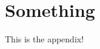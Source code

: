 \documentclass[../../main.tex]{subfiles}  %
\begin{document}
\section{Something}
This is the appendix!
\end{document}
